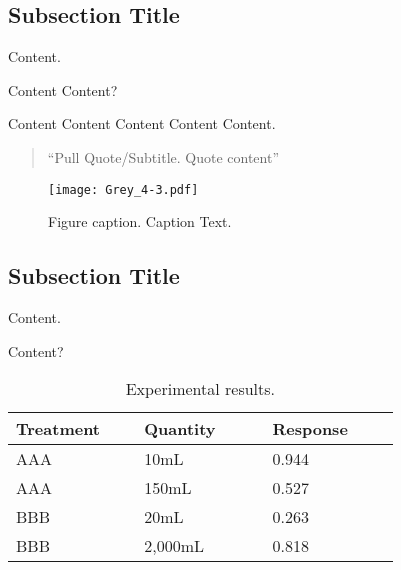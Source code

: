 \documentclass[
]{ImperialPoster}
\begin{document}

\titlesection{} %

\begin{multicols}{3} %

	\subsection{Subsection Title}

	Content.

	Content \textcolor{ICLBlue}{Content?}

	Content \textcolor{ICLBlue}{Content} Content \textcolor{ICLBlue}{Content} Content.

	\begin{quote}
		``Pull Quote/Subtitle. Quote content''
	\end{quote}

	\vspace{20pt} %

	\begin{figure}[H] %
		\texttt{[image: Grey\_4-3.pdf]} %
		\caption{Figure caption. Caption Text.}
	\end{figure}

	\subsection{Subsection Title}

	Content.

	Content?

	\begin{table}[H] %
		\caption{Experimental results.}
		\begin{tabular}{L{0.26\linewidth} C{0.26\linewidth} R{0.26\linewidth}}
			\toprule
			Treatment & Quantity & Response\\
			\midrule
			AAA & 10mL & 0.944\\
			AAA & 150mL & 0.527\\
			BBB & 20mL & 0.263\\
			BBB & 2,000mL & 0.818\\
			\bottomrule
		\end{tabular}
	\end{table}


\end{multicols}
\end{document}
